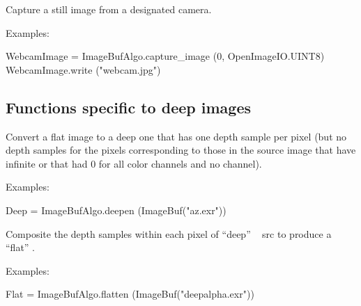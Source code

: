  
Capture a still image from a designated camera. 

\smallskip
\noindent Examples:
\begin{code}
    WebcamImage = ImageBufAlgo.capture_image (0, OpenImageIO.UINT8)
    WebcamImage.write ("webcam.jpg")
\end{code}
\apiend


\subsection{Functions specific to deep images}

  

Convert a flat image to a deep one that has one depth sample per pixel
(but no depth samples for the pixels corresponding to those in the source
image that have infinite  or that had 0 for all color channels and no
 channel).

\smallskip
\noindent Examples:
\begin{code}
    Deep = ImageBufAlgo.deepen (ImageBuf("az.exr"))
\end{code}
\apiend


  

Composite the depth samples within each pixel of ``deep'' \ImageBuf\ {\cf
src} to produce a ``flat'' \ImageBuf.

\smallskip
\noindent Examples:
\begin{code}
    Flat = ImageBufAlgo.flatten (ImageBuf("deepalpha.exr"))
\end{code}
\apiend

  

